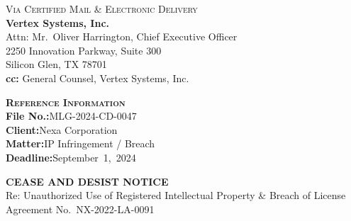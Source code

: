 \noindent
\begin{minipage}[t]{0.52\textwidth}
  {\color{NexaSlate}\footnotesize\scshape Via Certified Mail \& Electronic Delivery}\\[6pt]
  \textbf{Vertex Systems, Inc.}\\
  Attn: Mr.~Oliver Harrington, Chief Executive Officer\\
  2250 Innovation Parkway, Suite 300\\
  Silicon Glen, TX 78701\\[8pt]
  \textbf{cc:}\enspace
  General Counsel, Vertex Systems, Inc.
\end{minipage}%
\hfill
\begin{minipage}[t]{0.42\textwidth}\raggedleft
  \begin{noticebox}
    {\color{NexaNavy}\footnotesize\bfseries\scshape Reference Information}\\[4pt]
    {\footnotesize
      \textbf{File No.:}\quad MLG-2024-CD-0047\\
      \textbf{Client:}\quad Nexa Corporation\\
      \textbf{Matter:}\quad IP Infringement / Breach\\
      \textbf{Deadline:}\quad September~1,~2024
    }
  \end{noticebox}
\end{minipage}

\vspace{1.2cm}

\noindent
\begin{tcolorbox}[
  enhanced,
  colback=NexaNavy,
  colframe=NexaNavy,
  arc=3pt,
  left=12pt, right=12pt, top=9pt, bottom=9pt,
]
  \centering
  {\color{white}\bfseries\large\scshape
    CEASE AND DESIST NOTICE}\\[4pt]
  {\color{NexaGold}\small
    Re: Unauthorized Use of Registered Intellectual Property \&
    Breach of License Agreement No.~NX-2022-LA-0091}
\end{tcolorbox}
